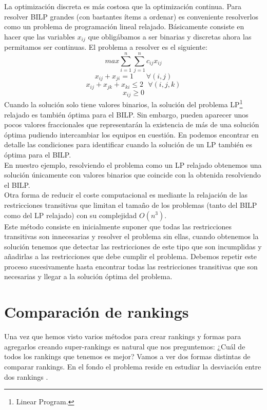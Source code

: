 La optimización discreta es más costosa que la optimización continua. Para resolver BILP grandes (con bastantes ítems a ordenar) es conveniente resolverlos como un problema de programación lineal relajado. Básicamente consiste en hacer que las variables $x_{ij}$ que obligábamos a ser binarias y discretas ahora las permitamos ser continuas. El problema a resolver es el siguiente:
\begin{equation} \label{optprob2}
	max \sum_{i=1}^{n} \sum_{j=1}^{n} c_{ij} x_{ij}
\end{equation}
\begin{equation*}
	x_{ij} + x_{ji} = 1 \ \ \ \ \ \ \ \ \forall (i,j)
\end{equation*}
\begin{equation*}
	x_{ij} + x_{jk} + x_{ki} \leq 2 \ \ \ \forall (i,j,k)
\end{equation*}
\begin{equation*}
	x_{ij} \geq 0
\end{equation*}
Cuando la solución solo tiene valores binarios, la solución del problema LP\footnote{Linear Program.} relajado es también óptima para el BILP. Sin embargo, pueden aparecer unos pocos valores fraccionales que representarán la existencia de más de una solución óptima pudiendo intercambiar los equipos en cuestión. En \cite{refbilp} podemos encontrar en detalle las condiciones para identificar cuando la solución de un LP también es óptima para el BILP.\\
En nuestro ejemplo, resolviendo el problema como un LP relajado obtenemos una solución únicamente con valores binarios que coincide con la obtenida resolviendo el BILP. \\

Otra forma de reducir el coste computacional es mediante la relajación de las restricciones transitivas que limitan el tamaño de los problemas (tanto del BILP como del LP relajado) con su complejidad $O(n^{3})$. \\
Este método consiste en inicialmente suponer que todas las restricciones transitivas son innecesarias y resolver el problema sin ellas, cuando obtenemos la solución tenemos que detectar las restricciones de este tipo que son incumplidas y añadirlas a las restricciones que debe cumplir el problema. Debemos repetir este proceso sucesivamente hasta encontrar todas las restricciones transitivas que son necesarias y llegar a la solución óptima del problema.\\


\section{Comparación de rankings}
Una vez que hemos visto varios métodos para crear rankings y formas para agregarlos creando super-rankings es natural que nos preguntemos: ¿Cuál de todos los rankings que tenemos es mejor? Vamos a ver dos formas distintas de comparar rankings. En el fondo el problema reside en estudiar la desviación entre dos rankings \cite{cap16}.

